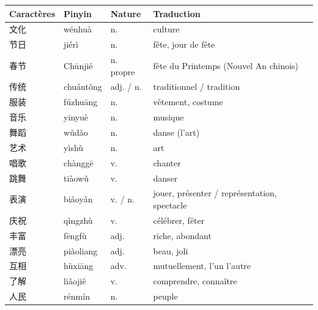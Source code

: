 \documentclass[11pt]{article}
\begin{document}
\begin{center}
\begin{tabularx}{\linewidth}{|X|X|X|X|}
\hline
\rowcolor{popblueL} Caractères & Pinyin & Nature & Traduction \\
\hline
文化 & wénhuà & n. & culture \\
\hline
节日 & jiérì & n. & fête, jour de fête \\
\hline
春节 & Chūnjié & n. propre & fête du Printemps (Nouvel An chinois) \\
\hline
传统 & chuántǒng & adj. / n. & traditionnel / tradition \\
\hline
服装 & fúzhuāng & n. & vêtement, costume \\
\hline
音乐 & yīnyuè & n. & musique \\
\hline
舞蹈 & wǔdǎo & n. & danse (l'art) \\
\hline
艺术 & yìshù & n. & art \\
\hline
唱歌 & chànggē & v. & chanter \\
\hline
跳舞 & tiàowǔ & v. & danser \\
\hline
表演 & biǎoyǎn & v. / n. & jouer, présenter / représentation, spectacle \\
\hline
庆祝 & qìngzhù & v. & célébrer, fêter \\
\hline
丰富 & fēngfù & adj. & riche, abondant \\
\hline
漂亮 & piàoliang & adj. & beau, joli \\
\hline
互相 & hùxiāng & adv. & mutuellement, l'un l'autre \\
\hline
了解 & liǎojiě & v. & comprendre, connaître \\
\hline
人民 & rénmín & n. & peuple \\
\hline
\end{tabularx}
\end{center}
\end{document}
